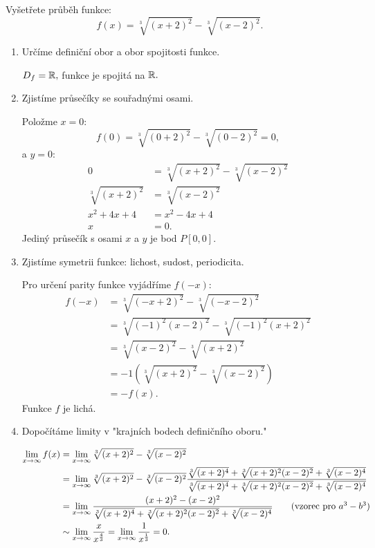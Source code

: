 \begin{example}
    Vyšetřete průběh funkce:
    $$f(x) = \sqrt[3]{(x+2)^2} - \sqrt[3]{(x-2)^2}.$$
    \begin{enumerate}
        \item Určíme definiční obor a obor spojitosti funkce. 
            
            $D_f = \mathbb{R}, $ funkce je spojitá na $\mathbb{R}.$

        \item Zjistíme průsečíky se souřadnými osami. 
            
            Položme $x=0:$ 
            $$f(0) = \sqrt[3]{(0+2)^2} - \sqrt[3]{(0 - 2)^2} = 0,$$
            a $y=0:$
            \begin{align*}
                0 &= \sqrt[3]{(x+2)^2} - \sqrt[3]{(x-2)^2} \\
                \sqrt[3]{(x+2)^2} &=  \sqrt[3]{(x-2)^2} \\
                x^2 + 4x + 4 &= x^2 -4x + 4 \\
                x&=0.
            \end{align*}
            Jediný průsečík s osami $x$ a $y$ je bod $P[0,0].$
        
        \item Zjistíme symetrii funkce: lichost, sudost, periodicita.

            Pro určení parity funkce vyjádříme $f(-x):$
            \begin{align*}
                f(-x) 
                &= \sqrt[3]{(-x+2)^2} - \sqrt[3]{(-x-2)^2} \\
                &= \sqrt[3]{(-1)^2(x-2)^2} - \sqrt[3]{(-1)^2(x+2)^2} \\
                &= \sqrt[3]{(x-2)^2} - \sqrt[3]{(x+2)^2} \\
                &= -1 (\sqrt[3]{(x+2)^2} - \sqrt[3]{(x-2)^2}) \\
                &= -f(x).
            \end{align*}
            Funkce $f$ je lichá.
        \item Dopočítáme limity v "krajních bodech definičního oboru."

            \begin{align*}
                \lim_{x \to \infty} f(x) 
                &= \lim_{x \to \infty} \sqrt[3]{(x+2)^2} - \sqrt[3]{(x - 2)^2} \\
                &= \lim_{x \to \infty} \sqrt[3]{(x+2)^2} - \sqrt[3]{(x - 2)^2} 
                \frac{\sqrt[3]{(x+2)^4} + \sqrt[3]{(x+2)^2(x - 2)^2} + \sqrt[3]{(x - 2)^4}}{\sqrt[3]{(x+2)^4} + \sqrt[3]{(x+2)^2(x - 2)^2} + \sqrt[3]{(x - 2)^4}} \\
                &= \lim_{x \to \infty} \frac{(x+2)^2 - (x-2)^2}{\sqrt[3]{(x+2)^4} + \sqrt[3]{(x+2)^2(x - 2)^2} + \sqrt[3]{(x - 2)^4}} \tag{vzorec pro $a^3 - b^3$} \\
                &\sim \lim_{x \to \infty} \frac{x}{x^{\frac{4}{3}}} 
                = \lim_{x \to \infty} \frac{1}{x^{\frac{1}{3}}} = 0.
            \end{align*}


\end{enumerate}
\end{example}
